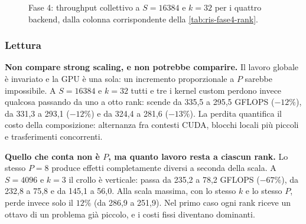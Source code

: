 \begin{figure}[H]
\centering
{}
\caption{Fase 4: throughput collettivo a $S=\num{16384}$ e $k=32$ per i
quattro backend, dalla colonna corrispondente della
\cref{tab:ris-fase4-rank}.}
\label{fig:ris-fase4-rank}
\end{figure}

\subsubsection*{Lettura}

\textbf{Non compare strong scaling, e non potrebbe comparire.} Il lavoro globale
è invariato e la GPU è una sola: un incremento proporzionale a $P$ sarebbe
impossibile. A $S=16384$ e $k=32$ tutti e tre i kernel custom perdono invece
qualcosa passando da uno a otto rank:  scende da 335,5 a
295,5 GFLOPS ($-12\%$),  da 331,3 a 293,1 ($-12\%$) e
 da 324,4 a 281,6 ($-13\%$). La perdita quantifica
il costo della composizione: alternanza fra contesti CUDA, blocchi locali più
piccoli e trasferimenti concorrenti.

\textbf{Quello che conta non è $P$, ma quanto lavoro resta a ciascun rank.} Lo
stesso $P=8$ produce effetti completamente diversi a seconda della scala. A
$S=4096$ e $k=3$ il crollo è verticale:  passa da 235,2 a
78,2 GFLOPS ($-67\%$),  da 232,8 a 75,8 e
 da 145,1 a 56,0. Alla scala massima, con lo stesso $k$
e lo stesso $P$,  perde invece solo il $12\%$ (da 286,9 a
251,9). Nel primo caso ogni rank riceve un ottavo di un problema già piccolo, e
i costi fissi diventano dominanti.

